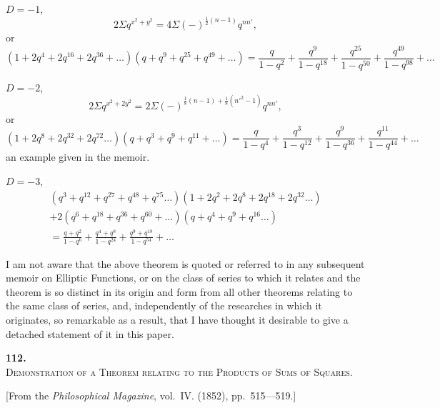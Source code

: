 \documentclass[11pt]{article}
\begin{document}
$D = -1$,
\[
2\Sigma q^{x^2+y^2} = 4\Sigma(-)^{\frac{1}{2}(n-1)} q^{nn'},
\]
or
\[
(1 + 2q^4 + 2q^{16} + 2q^{36} + \ldots)(q + q^9 + q^{25} + q^{49} + \ldots)
= \frac{q}{1-q^2} + \frac{q^9}{1-q^{18}} + \frac{q^{25}}{1-q^{50}} + \frac{q^{49}}{1-q^{98}} + \ldots
\]

$D = -2$,
\[
2\Sigma q^{x^2+2y^2} = 2\Sigma(-)^{\frac{1}{8}(n-1)+\frac{1}{8}(n'^2-1)} q^{nn'},
\]
or
\[
(1 + 2q^8 + 2q^{32} + 2q^{72} \ldots)(q + q^3 + q^9 + q^{11} + \ldots)
= \frac{q}{1-q^4} + \frac{q^3}{1-q^{12}} + \frac{q^9}{1-q^{36}} + \frac{q^{11}}{1-q^{44}} + \ldots
\]
an example given in the memoir.

\newpage
\setcounter{page}{48}

$D = -3$,
\begin{multline*}
(q^3 + q^{12} + q^{27} + q^{48} + q^{75} \ldots)(1 + 2q^2 + 2q^8 + 2q^{18} + 2q^{32} \ldots)\\
+ 2(q^6 + q^{18} + q^{36} + q^{60} + \ldots)(q + q^4 + q^9 + q^{16} \ldots)\\
= \frac{q+q^2}{1-q^6} + \frac{q^4+q^8}{1-q^{24}} + \frac{q^9+q^{18}}{1-q^{54}} + \ldots
\end{multline*}

I am not aware that the above theorem is quoted or referred to in any subsequent memoir on Elliptic Functions, or on the class of series to which it relates and the theorem is so distinct in its origin and form from all other theorems relating to the same class of series, and, independently of the researches in which it originates, so remarkable as a result, that I have thought it desirable to give a detached statement of it in this paper.


\newpage
\setcounter{page}{49}

\begin{center}
{\Large\bfseries 112.}\\[0.5em]
{\large\scshape Demonstration of a Theorem relating to the Products of Sums of Squares.}
\end{center}
\vspace{0.3em}
\begin{center}
\small [From the \textit{Philosophical Magazine}, vol.~IV. (1852), pp.~515---519.]
\end{center}
\vspace{0.5em}
\end{document}
